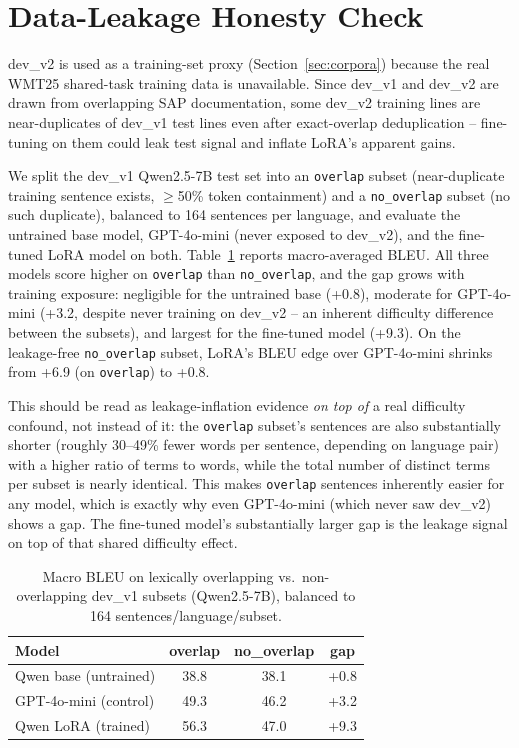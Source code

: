 \documentclass[11pt]{article}
\begin{document}
\section{Data-Leakage Honesty Check}
\label{sec:exp-leakage}

dev\_v2 is used as a training-set proxy (Section~\ref{sec:corpora}) because the real WMT25 shared-task training data is unavailable. Since dev\_v1 and dev\_v2 are drawn from overlapping SAP documentation, some dev\_v2 training lines are near-duplicates of dev\_v1 test lines even after exact-overlap deduplication -- fine-tuning on them could leak test signal and inflate LoRA's apparent gains.

We split the dev\_v1 Qwen2.5-7B test set into an \texttt{overlap} subset (near-duplicate training sentence exists, $\geq$50\% token containment) and a \texttt{no\_overlap} subset (no such duplicate), balanced to 164 sentences per language, and evaluate the untrained base model, GPT-4o-mini (never exposed to dev\_v2), and the fine-tuned LoRA model on both. Table~\ref{tab:leakage} reports macro-averaged BLEU. All three models score higher on \texttt{overlap} than \texttt{no\_overlap}, and the gap grows with training exposure: negligible for the untrained base (+0.8), moderate for GPT-4o-mini (+3.2, despite never training on dev\_v2 -- an inherent difficulty difference between the subsets), and largest for the fine-tuned model (+9.3). On the leakage-free \texttt{no\_overlap} subset, LoRA's BLEU edge over GPT-4o-mini shrinks from +6.9 (on \texttt{overlap}) to +0.8.

This should be read as leakage-inflation evidence \emph{on top of} a real difficulty confound, not instead of it: the \texttt{overlap} subset's sentences are also substantially shorter (roughly 30--49\% fewer words per sentence, depending on language pair) with a higher ratio of terms to words, while the total number of distinct terms per subset is nearly identical. This makes \texttt{overlap} sentences inherently easier for any model, which is exactly why even GPT-4o-mini (which never saw dev\_v2) shows a gap. The fine-tuned model's substantially larger gap is the leakage signal on top of that shared difficulty effect.

\begin{table}[t]
  \centering
  \small
  \begin{tabular}{lccc}
    \hline
    \textbf{Model} & \textbf{overlap} & \textbf{no\_overlap} & \textbf{gap} \\
    \hline
    Qwen base (untrained) & 38.8 & 38.1 & +0.8 \\
    GPT-4o-mini (control) & 49.3 & 46.2 & +3.2 \\
    Qwen LoRA (trained)   & 56.3 & 47.0 & +9.3 \\
    \hline
  \end{tabular}
  \caption{Macro BLEU on lexically overlapping vs.\ non-overlapping dev\_v1 subsets (Qwen2.5-7B), balanced to 164 sentences/language/subset.}
  \label{tab:leakage}
\end{table}
\end{document}
